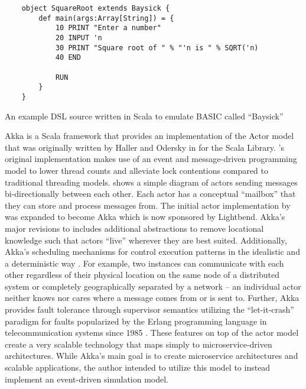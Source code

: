 \begin{listing}[bt!]
    \begin{verbatim}
    object SquareRoot extends Baysick {
        def main(args:Array[String]) = {
            10 PRINT "Enter a number"
            20 INPUT 'n
            30 PRINT "Square root of " % "'n is " % SQRT('n)
            40 END
            
            RUN
        }
    }
    \end{verbatim}
    \caption{An example DSL source written in Scala to emulate BASIC called ``Baysick'' \cite{FogusBaysick}}
    \label{lst:scala-dsl-basic}
\end{listing}

Akka is a Scala framework that provides an implementation of the Actor model \cite{Agha1985} that was originally written by Haller and Odersky in \cite{Haller2009} for the Scala Library. \cite{Haller2009}'s original implementation makes use of an event and message-driven programming model to lower thread counts and alleviate lock contentions compared to traditional threading models.  shows a simple diagram of actors sending messages bi-directionally between each other. Each actor has a conceptual ``mailbox'' that they can store and process messages from. The initial actor implementation by \cite{Haller2009} was expanded to become Akka which is now sponsored by Lightbend. Akka's major revisions to \cite{Haller2009} includes additional abstractions to remove locational knowledge such that actors ``live'' wherever they are best suited. Additionally, Akka's scheduling mechanisms for control \akkaActor{} execution patterns in the idealistic and a deterministic way \cite{TypesafeAkka2015}. For example, two \akkaActor{} instances can communicate with each other regardless of their physical location on the same node of a distributed system or completely geographically separated by a network -- an individual actor neither knows nor cares where a message comes from or is sent to. Further, Akka provides fault tolerance through supervisor semantics utilizing the ``let-it-crash'' paradigm for faults popularized by the Erlang programming language in telecommunication systems since 1985 \cite{Armstrong2010}. These features on top of the actor model create a very scalable technology that maps simply to microservice-driven architectures. While Akka's main goal is to create microservice architectures and scalable applications, the author intended to utilize this model to instead implement an event-driven simulation model.

